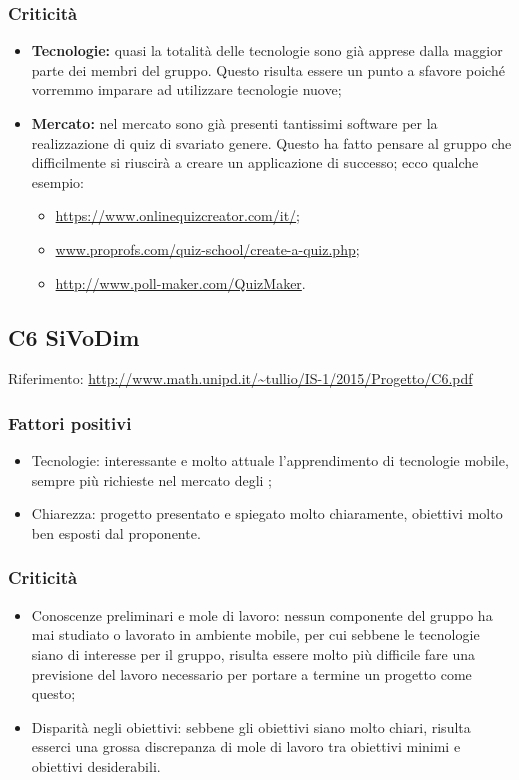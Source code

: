 \documentclass{scalatekids-article}
\begin{document}
\subsubsection{Criticità}
\begin{itemize}
\item \textbf{Tecnologie:} quasi la totalità delle tecnologie sono già apprese dalla maggior parte dei membri del gruppo. Questo risulta essere un punto a sfavore poiché vorremmo imparare ad utilizzare tecnologie nuove;
\item \textbf{Mercato:} nel mercato sono già presenti tantissimi software per la realizzazione di quiz di svariato genere. Questo ha fatto pensare al gruppo che difficilmente si riuscirà a creare un applicazione di successo; ecco qualche esempio:
  \begin{itemize}
  \item\url{https://www.onlinequizcreator.com/it/};
  \item\url{www.proprofs.com/quiz-school/create-a-quiz.php};
  \item\url{http://www.poll-maker.com/QuizMaker}.
  \end{itemize}
\end{itemize}

\subsection{C6 SiVoDim}
Riferimento: \url{http://www.math.unipd.it/~tullio/IS-1/2015/Progetto/C6.pdf}\\
\subsubsection{Fattori positivi}
\begin{itemize}
\item{Tecnologie:} interessante e molto attuale l'apprendimento di tecnologie mobile, sempre più richieste nel mercato degli ;
\item{Chiarezza:} progetto presentato e spiegato molto chiaramente, obiettivi molto ben esposti dal proponente.
\end{itemize}
\subsubsection{Criticità}
\begin{itemize}
\item{Conoscenze preliminari e mole di lavoro:} nessun componente del gruppo ha mai studiato o lavorato in ambiente mobile, per cui sebbene le tecnologie siano di interesse per il gruppo, risulta essere molto più difficile fare una previsione del lavoro necessario per portare a termine un progetto come questo;
\item{Disparità negli obiettivi:} sebbene gli obiettivi siano molto chiari, risulta esserci una grossa discrepanza di mole di lavoro tra obiettivi minimi e obiettivi desiderabili.
\end{itemize}
\end{document}
